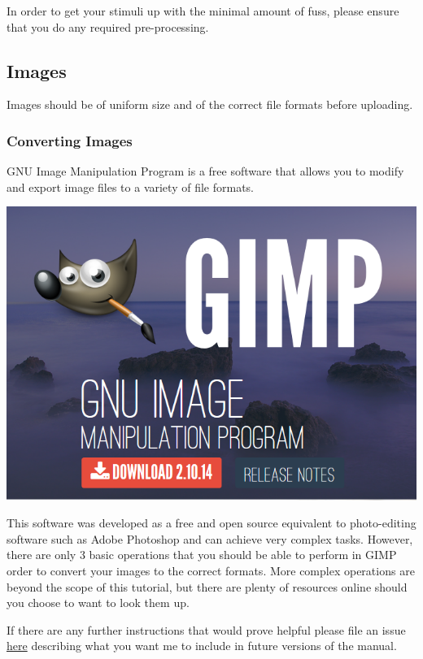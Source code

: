 \documentclass[]{book}
\begin{document}
In order to get your stimuli up with the minimal amount of fuss, please ensure that you do any required pre-processing.

\hypertarget{images}{%
\subsection{Images}\label{images}}

Images should be of uniform size and of the correct file formats before uploading.

\hypertarget{converting-images}{%
\subsubsection*{Converting Images}\label{converting-images}}

GNU Image Manipulation Program \citep[``GIMP'',][]{gimp} is a free software that allows you to modify and export image files to a variety of file formats.

\includegraphics{images/screenshots/gimp.png}

This software was developed as a free and open source equivalent to photo-editing software such as Adobe Photoshop and can achieve very complex tasks. However, there are only 3 basic operations that you should be able to perform in GIMP order to convert your images to the correct formats. More complex operations are beyond the scope of this tutorial, but there are plenty of resources online should you choose to want to look them up.

If there are any further instructions that would prove helpful please file an issue \href{https://github.com/RebeccaJLai/exp_manual/issues}{here} describing what you want me to include in future versions of the manual.
\end{document}
